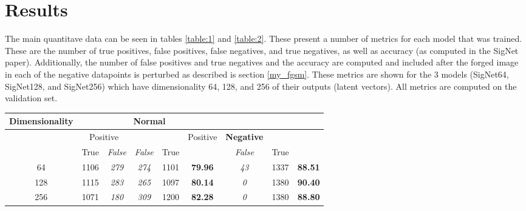 \section{Results}\label{sec:results}

The main quantitave data can be seen in tables \ref{table:1} and \ref{table:2}.
These present a number of metrics for each model that was trained.
These are the number of true positives, false positives, false negatives, and true negatives, as well as accuracy (as computed in the SigNet paper\cite{sig_net}).
Additionally, the number of false positives and true negatives and the accuracy are computed and included after the forged image in each of the negative datapoints is perturbed as described is section \ref{my_fgsm}.
These metrics are shown for the 3 models (SigNet64, SigNet128, and SigNet256) which have dimensionality 64, 128, and 256 of their outputs (latent vectors).
All metrics are computed on the validation set.

\begin{table*}[t]
    \centering
    \begin{tabular}{|c | c >{\em}c | >{\em}c c | >{\bfseries}c | >{\em}c c >{\bfseries}c|}
        \hline
        \multirow{3}{*}{Dimensionality} & \multicolumn{5}{c|}{Normal} & \multicolumn{3}{c|}{Adversarial}\\
        \hline
        & \multicolumn{2}{c|}{Positive} & \multicolumn{2}{c|}{Negative} & \multirow{2}{*}{Accuracy} & Positive & Negative & \multirow{2}{*}{Accuracy}\\
        & True & False & False & True & & False & True & \\
        \hline
        64 & 1106 & 279 & 274 & 1101 & 79.96 & 43 & 1337 & 88.51\\
        128 & 1115 & 283 & 265 & 1097 & 80.14 & 0 & 1380 & 90.40\\
        256 & 1071 & 180 & 309 & 1200 & 82.28 & 0 & 1380 & 88.80\\
        \hline
    \end{tabular}
    \caption{Comparison of Accuracy using Latent Vector Sizes after 5 Epochs}
    \label{table:1}
\end{table*}

